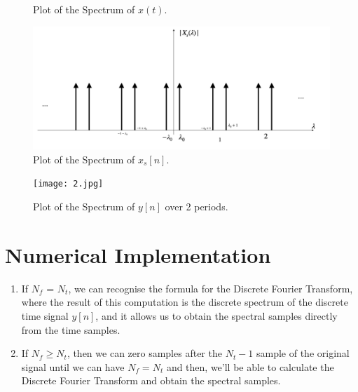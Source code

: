 \documentclass[14pt]{article}
\begin{document}
\begin{enumerate}[label=\alph*)]
\begin{figure}[hp]
		\caption{Plot of the Spectrum of $x(t)$.}
		\label{fig1}
	\end{figure}
	\begin{figure}[hp]
		\centering		
		\includegraphics[width = 16cm]{3.png}
		\caption{Plot of the Spectrum of $x_s[n]$.}
		\label{fig2}
	\end{figure}
	
	\begin{figure}[t]
		\centering		
		\texttt{[image: 2.jpg]}
		\caption{Plot of the Spectrum of $y[n]$ over 2 periods.}
		\label{fig1}
	\end{figure}

	\end{enumerate}
	\section*{Numerical Implementation}
	\begin{enumerate}[label=\alph*)]
	\item If $N_f$ = $N_t$, we can recognise the formula for the Discrete Fourier Transform, where the result of this computation is the discrete spectrum of the discrete time signal $y[n]$, and it allows us to obtain the spectral samples directly from the time samples.
	\item If $N_f \geq N_t$, then we can zero samples after the $N_t -1 $ sample of the original signal until we can have $N_f = N_t$ and then, we'll be able to calculate the Discrete Fourier Transform and obtain the spectral samples.
	\end{enumerate}	
	
\end{document}
